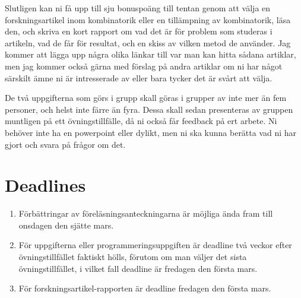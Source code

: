 \documentclass{tufte-handout}
\begin{document}
Slutligen kan ni få upp till sju bonuspoäng till tentan genom att välja en forskningsartikel inom kombinatorik eller en tillämpning av kombinatorik, läsa den, och skriva en kort rapport om vad det är för problem som studeras i artikeln, vad de får för resultat, och en skiss av vilken metod de använder. Jag kommer att lägga upp några olika länkar till var man kan hitta sådana artiklar, men jag kommer också gärna med förslag på andra artiklar om ni har något särskilt ämne ni är intresserade av eller bara tycker det är svårt att välja.

De två uppgifterna som görs i grupp skall göras i grupper av inte mer än fem personer, och helst inte färre än fyra. Dessa skall sedan presenteras av gruppen muntligen på ett övningstillfälle, då ni också får feedback på ert arbete. Ni behöver inte ha en powerpoint eller dylikt, men ni ska kunna berätta vad ni har gjort och svara på frågor om det.

\section{Deadlines}

\begin{enumerate}
	\item Förbättringar av föreläsningsanteckningarna är möjliga ända fram till onsdagen den sjätte mars.
	\item För uppgifterna eller programmeringsuppgiften är deadline två veckor efter övningstillfället faktiskt hölls, förutom om man väljer det sista övningstillfället, i vilket fall deadline är fredagen den första mars.
	\item För forskningsartikel-rapporten är deadline fredagen den första mars.
\end{enumerate}
\end{document}
